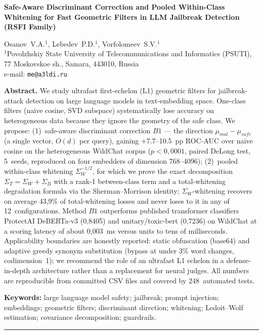 \documentclass[10pt,a4paper]{article}
\newcommand{\secfmt}[1]{\vspace{5pt}\noindent{\large\bfseries #1}\par\vspace{1.5pt}}
\begin{document}
\begin{center}
{\normalsize\bfseries Safe-Aware Discriminant Correction and Pooled Within-Class Whitening for Fast Geometric Filters in LLM Jailbreak Detection (RSFI Family)\par}
\vspace{2pt}
{\small Osanov~V.A.$^{1}$, Lebedev~P.D.$^{1}$, Vorfolomeev~S.V.$^{1}$\\
$^{1}$Povolzhskiy State University of Telecommunications and Informatics (PSUTI), 77 Moskovskoe sh., Samara, 443010, Russia\\
e-mail: \texttt{me@a3ldi.ru}}
\end{center}
\vspace{2pt}

\noindent\textbf{Abstract.} We study ultrafast first-echelon (L1) geometric filters for jailbreak-attack detection on large language models in text-embedding space. One-class filters (naive cosine, SVD subspace) systematically lose accuracy on heterogeneous data because they ignore the geometry of the safe class. We propose: (1)~safe-aware discriminant correction $B1$ — the direction $\mu_{mal}-\mu_{safe}$ (a single vector, $O(d)$ per query), gaining +7.7--10.5~pp ROC-AUC over naive cosine on the heterogeneous WildChat corpus ($p<0{,}0001$, paired DeLong test, 5~seeds, reproduced on four embedders of dimension 768--4096); (2)~pooled within-class whitening $\Sigma_W^{-1/2}$, for which we prove the exact decomposition $\Sigma_T=\Sigma_W+\Sigma_B$ with a rank-1 between-class term and a total-whitening degradation formula via the Sherman--Morrison identity; $\Sigma_W$-whitening recovers on average 43{,}9\% of total-whitening losses and never loses to it in any of 12~configurations. Method $B1$ outperforms published transformer classifiers ProtectAI DeBERTa-v3 (0{,}8405) and unitary/toxic-bert (0{,}7236) on WildChat at a scoring latency of about 0{,}003~ms versus units to tens of milliseconds. Applicability boundaries are honestly reported: static obfuscation (base64) and adaptive greedy synonym substitution (bypass at under 3\% word changes, codimension~1); we recommend the role of an ultrafast L1 echelon in a defense-in-depth architecture rather than a replacement for neural judges. All numbers are reproducible from committed CSV files and covered by 248~automated tests.\par\vspace{2pt}
\noindent\textbf{Keywords:} large language model safety; jailbreak; prompt injection; embeddings; geometric filters; discriminant direction; whitening; Ledoit--Wolf estimation; covariance decomposition; guardrails.\par\vspace{4pt}
\hrule\vspace{5pt}
\secfmt{1. Введение}
\end{document}

